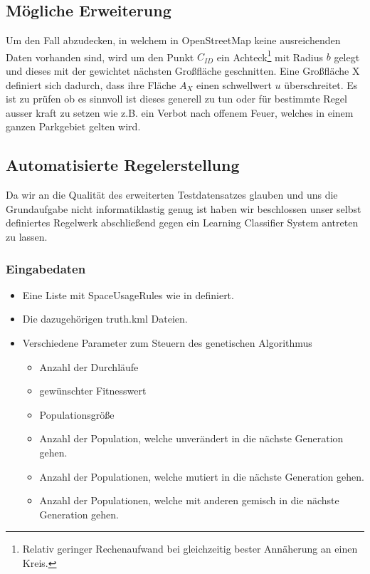\subsection{Mögliche Erweiterung}
Um den Fall abzudecken, in welchem in OpenStreetMap keine ausreichenden Daten vorhanden sind, wird um den Punkt $C_{ID}$ ein
Achteck\footnote{Relativ geringer Rechenaufwand bei gleichzeitig bester Annäherung an einen Kreis.} mit Radius $b$ gelegt
und dieses mit der gewichtet nächsten Großfläche geschnitten.
Eine Großfläche X definiert sich dadurch, dass ihre Fläche $A_X$ einen schwellwert $u$ überschreitet.
Es ist zu prüfen ob es sinnvoll ist dieses generell zu tun oder für bestimmte Regel ausser kraft zu setzen wie
z.B. ein Verbot nach offenem Feuer, welches in einem ganzen Parkgebiet gelten wird.

\subsection{Automatisierte Regelerstellung}
Da wir an die Qualität des erweiterten Testdatensatzes glauben und uns die Grundaufgabe nicht informatiklastig genug ist
haben wir beschlossen unser selbst definiertes Regelwerk abschließend gegen ein Learning Classifier System antreten zu lassen.
\subsubsection{Eingabedaten}
\begin{itemize}
\item Eine Liste mit SpaceUsageRules wie in  definiert.
\item Die dazugehörigen truth.kml Dateien.
\item Verschiedene Parameter zum Steuern des genetischen Algorithmus \begin{itemize}
\item Anzahl der Durchläufe
\item gewünschter Fitnesswert
\item Populationsgröße
\item Anzahl der Population, welche unverändert in die nächste Generation gehen.
\item Anzahl der Populationen, welche mutiert in die nächste Generation gehen.
\item Anzahl der Populationen, welche mit anderen gemisch in die nächste Generation gehen.
\end{itemize}
\end{itemize}
